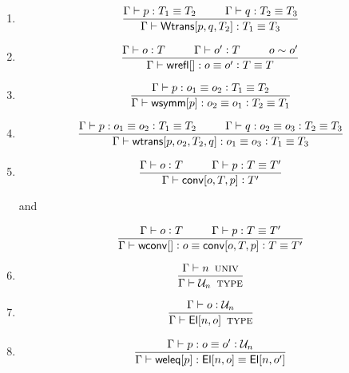 \documentclass[11pt]{article}
\newcommand{\eqd}{\equiv}
\newcommand{\Eu}{{\cal U}}
\newcommand\spc{{\hskip 26pt}}
\newcommand{\ccolon}{\vcentcolon}
\newcommand{\ccheck}{\vcentcolon}            %
\newcommand{\csynth}{\vcentcolon\vcentcolon} %
\renewcommand{\csynth}{\ccheck}              %
\newcommand{\Univ}{\mathop{\text{ \sc univ}}}
\newcommand{\TYPE}{\mathop{\text{ \sc type}}}
\newcommand{\ha}[2]{#1[#2]}
\newcommand{\Wtrans}{{\sf Wtrans}}
\newcommand{\El}{{\sf El}}
\newcommand{\annot}{{\sf annot}}
\newcommand{\haa}[2]{\ha\annot{#1,#2}}
\renewcommand{\haa}[2]{#1}
\newcommand{\conv}{{\sf conv}}
\newcommand{\wconv}{{\sf wconv}}
\newcommand{\weleq}{{\sf weleq}}
\newcommand{\wrefl}{{\sf wrefl}}
\newcommand{\wsymm}{{\sf wsymm}}
\newcommand{\wtrans}{{\sf wtrans}}
\begin{document}
\begin{enumerate}
\item 
\[
  \frac{
    \Gamma \vdash p:T_1\eqd T_2
    \spc
    \Gamma \vdash q:T_2\eqd T_3
  }
  {\Gamma \vdash \ha\Wtrans{p,q,T_2}: T_1\eqd T_3 }
\]

\item 
\[\frac{
  \Gamma \vdash o \ccheck{T}
  \spc
  \Gamma \vdash o' \ccheck{T}
  \spc
  o \sim o'
  } {
  \Gamma \vdash  \ha\wrefl{}: o \eqd o' \ccolon T \eqd T
  } 
\]

\item 
\[\frac
    {\Gamma \vdash p:o_1\eqd o_2 \ccolon T_1 \eqd T_2}
    {\Gamma \vdash \ha\wsymm{p}:o_2\eqd o_1 \ccolon T_2 \eqd T_1}\]

\item 
\[\frac{\Gamma \vdash p:o_1\eqd o_2 \ccolon T_1 \eqd T_2
  \spc
  \Gamma \vdash q:o_2\eqd o_3 \ccolon T_2 \eqd T_3
  } {
  \Gamma \vdash \ha\wtrans{p,o_2,T_2,q}:o_1\eqd o_3 \ccolon T_1 \eqd T_3}
\]

\item 
\[\frac
    { \Gamma \vdash o \ccolon T \spc \Gamma \vdash p : T \eqd T'}
    { \Gamma \vdash \ha\conv{o,T,p} \ccolon T' }\]

and

\[\frac
    { \Gamma \vdash o \ccolon T \spc
      \Gamma \vdash p : T \eqd T' }
    { \Gamma \vdash \ha\wconv{} \ccolon o \eqd \ha\conv{o,T,p} \ccolon T \eqd T'}\]




\item

\[\frac{\Gamma \vdash n \Univ  }
       {\Gamma \vdash \Eu_n \TYPE  }\]

\item

\[\frac{
  \Gamma \vdash o \csynth{\Eu_n}}{
  \Gamma \vdash \ha\El{n,o}\TYPE }\]

\item 

\[\frac{\Gamma \vdash p : o \eqd o' \ccheck \Eu_n}
       {\Gamma \vdash \ha\weleq{p} : \ha\El{n,o} \eqd \ha\El{n,o'}}\]


\end{enumerate}
\end{document}
